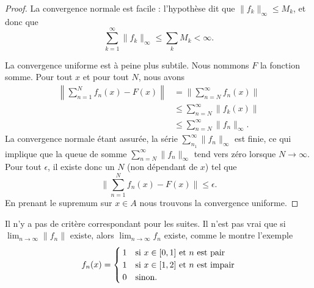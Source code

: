 \begin{proof}
    La convergence normale est facile : l'hypothèse dit que \( \| f_k \|_{\infty}\leq M_k\), et donc que
    \begin{equation}
        \sum_{k=1}^{\infty}\| f_k \|_{\infty}\leq \sum_kM_k<\infty.
    \end{equation}
    
    La convergence uniforme est à peine plus subtile. Nous nommons \( F\) la fonction somme. Pour tout \( x\) et pour tout \( N\), nous avons
    \begin{subequations}
        \begin{align}
            \left\| \sum_{n=1}^Nf_n(x)-F(x) \right\|&=\| \sum_{n=N}^{\infty}f_n(x) \|\\
            &\leq\sum_{n=N}^{\infty}\| f_k(x) \|\\
            &\leq \sum_{n=N}^{\infty}\| f_n \|_{\infty}.
        \end{align}
    \end{subequations}
    La convergence normale étant assurée, la série \( \sum_{n_1}^{\infty}\| f_n \|_{\infty}\) est finie, ce qui implique que la queue de somme \( \sum_{n=N}^{\infty}\| f_n \|_{\infty}\) tend vers zéro lorsque \( N\to \infty\). Pour tout \( \epsilon\), il existe donc un \( N\) (non dépendant de \( x\)) tel que
    \begin{equation}
        \| \sum_{n=1}^Nf_n(x)-F(x) \|\leq \epsilon.
    \end{equation}
    En prenant le supremum sur \( x\in A\) nous trouvons la convergence uniforme.
\end{proof}

\begin{remark}
    Il n'y a pas de critère correspondant pour les suites. Il n'est pas vrai que si \( \lim_{n\to \infty}\| f_n \| \) existe, alors \( \lim_{n\to \infty} f_n\) existe, comme le montre l'exemple
    \begin{equation}
        f_n(x)=\begin{cases}
            1    &   \text{si \( x\in\mathopen[ 0 , 1 \mathclose]\) et \( n\) est pair}\\
            1    &    \text{si \( x\in\mathopen[ 1 , 2 \mathclose]\) et \( n\) est impair}\\
             0   &    \text{sinon.}
        \end{cases}
    \end{equation}
\end{remark}

